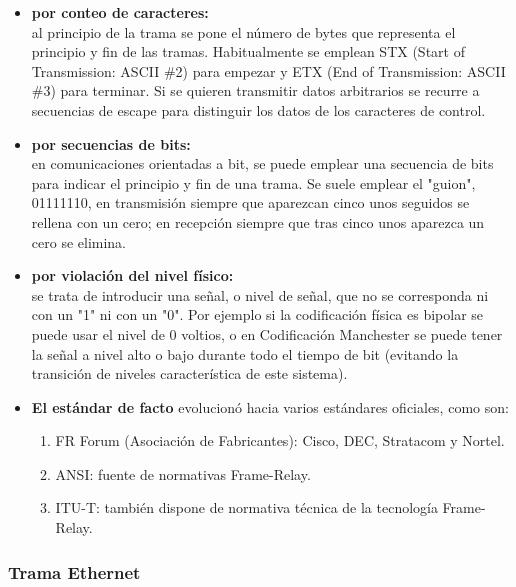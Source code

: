 \documentclass[a4paper]{article}
\begin{document}
	\begin{itemize}
		\item \textbf{por conteo de caracteres:} \\ al principio de la trama se pone el número de bytes que representa el principio y fin de las tramas. Habitualmente se emplean STX (Start of Transmission: ASCII \#2) para empezar y ETX (End of Transmission: ASCII \#3) para terminar. Si se quieren transmitir datos arbitrarios se recurre a secuencias de escape para distinguir los datos de los caracteres de control.
		\item \textbf{por secuencias de bits:} \\ en comunicaciones orientadas a bit, se puede emplear una secuencia de bits para indicar el principio y fin de una trama. Se suele emplear el "guion", 01111110, en transmisión siempre que aparezcan cinco unos seguidos se rellena con un cero; en recepción siempre que tras cinco unos aparezca un cero se elimina.
		\item \textbf{por violación del nivel físico:} \\ se trata de introducir una señal, o nivel de señal, que no se corresponda ni con un "1" ni con un "0". Por ejemplo si la codificación física es bipolar se puede usar el nivel de 0 voltios, o en Codificación Manchester se puede tener la señal a nivel alto o bajo durante todo el tiempo de bit (evitando la transición de niveles característica de este sistema).
		\item \textbf{El estándar de facto} evolucionó hacia varios estándares oficiales, como son:
		\begin{enumerate}
			\item FR Forum (Asociación de Fabricantes): Cisco, DEC, Stratacom y Nortel.
			\item ANSI: fuente de normativas Frame-Relay.
			\item ITU-T: también dispone de normativa técnica de la tecnología Frame-Relay.
		\end{enumerate}
	\end{itemize}
	
	\subsubsection{Trama Ethernet}
	
	\noindent{}
	
\end{document}
